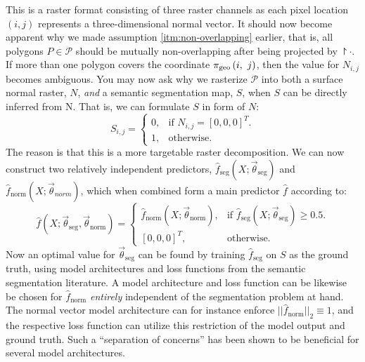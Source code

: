 This is a raster format consisting of three raster channels as each pixel location $(i, j)$ represents a three-dimensional normal vector.
It should now become apparent why we made assumption \ref{itm:non-overlapping} earlier, that is, all polygons $P \in \mathcal{P}$ should be mutually non-overlapping after being projected by $\project{\cdot}$.
If more than one polygon covers the coordinate $\pi_{\mathrm{geo}}\left(i,~j\right)$, then the value for $N_{i,j}$ becomes ambiguous.
You may now ask why we rasterize $\mathcal{P}$ into both a surface normal raster, $N$, \emph{and} a semantic segmentation map, $S$, when $S$ can be directly inferred from N.
That is, we can formulate $S$ in form of $N$:
\begin{equation*}
  S_{i, j}
  =
  \begin{cases}
    0, &\text{if } N_{i,j} = {\left[0, 0, 0\right]}^T.  \\
    1, &\text{otherwise.}
  \end{cases}
\end{equation*}
The reason is that this is a more targetable raster decomposition.
We can now construct two relatively independent predictors, $\hat{f}_{\mathrm{seg}}(X; \vec{\theta}_{\mathrm{seg}})$ and $\hat{f}_{\mathrm{norm}}(X; \vec{\theta}_{norm})$, which when combined form a main predictor $\hat{f}$ according to:
\begin{equation*}
  \hat{f}\left(X; \vec{\theta}_{\mathrm{seg}}, \vec{\theta}_{\mathrm{norm}}\right)
  =
  \begin{cases}
    \hat{f}_{\mathrm{norm}}\left(X; \vec{\theta}_{\mathrm{norm}}\right), &\text{if } \hat{f}_{\mathrm{seg}}\left(X; \vec{\theta}_{\mathrm{seg}}\right) \geq 0.5. \\
    {\left[0, 0, 0\right]}^T, &\text{otherwise.}
  \end{cases}
\end{equation*}
Now an optimal value for $\vec{\theta}_{\mathrm{seg}}$ can be found by training $\hat{f}_{\mathrm{seg}}$ on $S$ as the ground truth, using model architectures and loss functions from the semantic segmentation literature.
A model architecture and loss function can be likewise be chosen for $\hat{f}_{\mathrm{norm}}$ \emph{entirely} independent of the segmentation problem at hand.
The normal vector model architecture can for instance enforce $||\hat{f}_{\mathrm{norm}}||_2 \equiv 1$, and the respective loss function can utilize this restriction of the model output and ground truth.
Such a \enquote{separation of concerns} has been shown to be beneficial for several model architectures.


